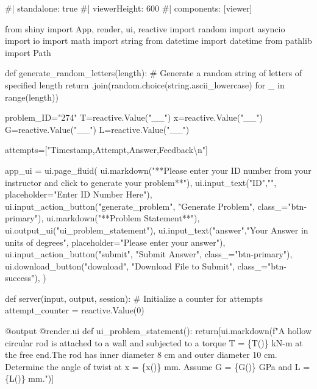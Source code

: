\documentclass[
  letterpaper,
  DIV=11,
  numbers=noendperiod]{scrreprt}
\newenvironment{Shaded}{\begin{snugshade}}{\end{snugshade}}
\newcommand{\NormalTok}[1]{\textcolor[rgb]{0.00,0.23,0.31}{#1}}
\begin{document}
\begin{Shaded}
\begin{Highlighting}[]
\NormalTok{\#| standalone: true}
\NormalTok{\#| viewerHeight: 600}
\NormalTok{\#| components: [viewer]}

\NormalTok{from shiny import App, render, ui, reactive}
\NormalTok{import random}
\NormalTok{import asyncio}
\NormalTok{import io}
\NormalTok{import math}
\NormalTok{import string}
\NormalTok{from datetime import datetime}
\NormalTok{from pathlib import Path}

\NormalTok{def generate\_random\_letters(length):}
\NormalTok{    \# Generate a random string of letters of specified length}
\NormalTok{    return \textquotesingle{}\textquotesingle{}.join(random.choice(string.ascii\_lowercase) for \_ in range(length)) }

\NormalTok{problem\_ID="274"}
\NormalTok{T=reactive.Value("\_\_")}
\NormalTok{x=reactive.Value("\_\_")}
\NormalTok{G=reactive.Value("\_\_")}
\NormalTok{L=reactive.Value("\_\_")}

\NormalTok{attempts=["Timestamp,Attempt,Answer,Feedback\textbackslash{}n"]}

\NormalTok{app\_ui = ui.page\_fluid(}
\NormalTok{    ui.markdown("**Please enter your ID number from your instructor and click to generate your problem**"),}
\NormalTok{    ui.input\_text("ID","", placeholder="Enter ID Number Here"),}
\NormalTok{    ui.input\_action\_button("generate\_problem", "Generate Problem", class\_="btn{-}primary"),}
\NormalTok{    ui.markdown("**Problem Statement**"),}
\NormalTok{    ui.output\_ui("ui\_problem\_statement"),}
\NormalTok{    ui.input\_text("answer","Your Answer in units of degrees", placeholder="Please enter your answer"),}
\NormalTok{    ui.input\_action\_button("submit", "Submit Answer", class\_="btn{-}primary"),}
\NormalTok{    ui.download\_button("download", "Download File to Submit", class\_="btn{-}success"),}
\NormalTok{)}


\NormalTok{def server(input, output, session):}
\NormalTok{    \# Initialize a counter for attempts}
\NormalTok{    attempt\_counter = reactive.Value(0)}

\NormalTok{    @output}
\NormalTok{    @render.ui}
\NormalTok{    def ui\_problem\_statement():}
\NormalTok{        return[ui.markdown(f"A hollow circular rod is attached to a wall and subjected to a torque T = \{T()\} kN{-}m at the free end.The rod has inner diameter 8 cm and outer diameter 10 cm.  Determine the angle of twist at x = \{x()\} mm. Assume G = \{G()\} GPa and L = \{L()\} mm.")]}
    

\end{Highlighting}
\end{Shaded}
\end{document}
